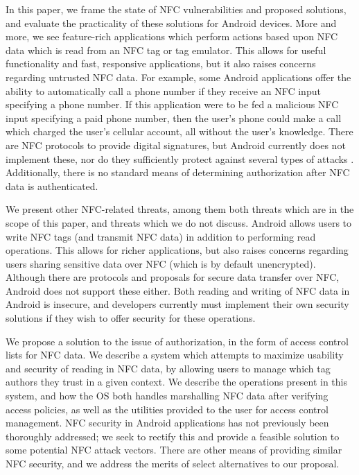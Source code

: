 \documentclass[12pt]{article}
\begin{document}
In this paper, we frame the state of NFC vulnerabilities and proposed solutions, and evaluate the practicality of these solutions for Android devices.
More and more, we see feature-rich applications which perform actions based upon NFC data which is read from an NFC tag or tag emulator.
This allows for useful functionality and fast, responsive applications, but it also raises concerns regarding untrusted NFC data.
For example, some Android applications offer the ability to automatically call a phone number if they receive an NFC input specifying a phone number.
If this application were to be fed a malicious NFC input specifying a paid phone number, then the user's phone could make a call which charged the user's cellular account, all without the user's knowledge.
There are NFC protocols to provide digital signatures, but Android currently does not implement these, nor do they sufficiently protect against several types of attacks \cite{roland2011}.
Additionally, there is no standard means of determining authorization after NFC data is authenticated.

We present other NFC-related threats, among them both threats which are in the scope of this paper, and threats which we do not discuss.
Android allows users to write NFC tags (and transmit NFC data) in addition to performing read operations.
This allows for richer applications, but also raises concerns regarding users sharing sensitive data over NFC (which is by default unencrypted).
Although there are protocols and proposals for secure data transfer over NFC, Android does not support these either.
Both reading and writing of NFC data in Android is insecure, and developers currently must implement their own security solutions if they wish to offer security for these operations.

We propose a solution to the issue of authorization, in the form of access control lists for NFC data.
We describe a system which attempts to maximize usability and security of reading in NFC data, by allowing users to manage which tag authors they trust in a given context.
We describe the operations present in this system, and how the OS both handles marshalling NFC data after verifying access policies, as well as the utilities provided to the user for access control management.
NFC security in Android applications has not previously been thoroughly addressed; we seek to rectify this and provide a feasible solution to some potential NFC attack vectors.
There are other means of providing similar NFC security, and we address the merits of select alternatives to our proposal.
\end{document}
